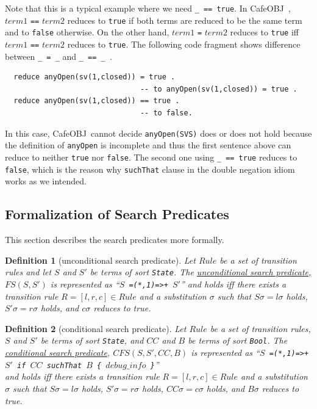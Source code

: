 \documentclass[12pt]{report}
\newtheorem{definition}{Definition}
\newcommand{\stt}[1]{{\small{\tt {#1}}}}
\newcommand{\ul}{\underline}
\newcommand{\cafeobj}{{\sf CafeOBJ}~}
\begin{document}
Note that this is a typical example where we need \stt{\_ == true}. In
\cafeobj, $term1$ {\tt ==} $term2$ reduces to {\tt true} if both terms
are reduced to be the same term and to {\tt false} otherwise. On the
other hand, $term1$ {\tt =} $term2$ reduces to {\tt true} iff $term1$
{\tt ==} $term2$ reduces to {\tt true}. The following code fragment
shows difference between \stt{\_ = \_} and \stt{\_ == \_ }.
\small
\begin{verbatim}
  reduce anyOpen(sv(1,closed)) = true .
                               -- to anyOpen(sv(1,closed)) = true .
  reduce anyOpen(sv(1,closed)) == true . 
                               -- to false.
\end{verbatim}
\normalsize
In this case, \cafeobj cannot decide \stt{anyOpen(SVS)} does or does
not hold because the definition of {\tt anyOpen} is incomplete and
thus the first sentence above can reduce to neither {\tt true} nor
{\tt false}.  The second one using \stt{\_ == true} reduces to
{\tt false}, which is the reason why {\tt suchThat} clause in the
double negation idiom works as we intended.

\subsection{Formalization of Search Predicates}
\label{sec:formalSeach}
This section describes the search predicates more formally.  
\begin{definition}[unconditional search predicate]
  Let $Rule$ be a set of transition rules and let $S$ and $S'$ be
  terms of sort {\tt State}. The \ul{unconditional search predicate,
    $FS(S,S')$} is represented as ``\stt{$S$ =(*,1)=>+ $S'$}''
  and holds iff there exists a transition rule $R=[l,r,c]\in Rule$ and
  a substitution $\sigma$ such that $S\sigma=l\sigma$ holds,
  $S'\sigma=r\sigma$ holds, and $c\sigma$ reduces to true.
\end{definition}
\begin{definition}[conditional search predicate]
  Let $Rule$ be a set of transition rules, $S$ and $S'$ be terms of
  sort {\tt State}, and $CC$ and $B$ be terms of sort {\tt Bool}. The
  \ul{conditional search predicate}, \ul{$CFS(S,S',CC,B)$} is
  represented as ``\stt{$S$ =(*,1)=>+ $S'$ if $CC$ suchThat $B$ \{
    $debug\_info$ \}}''\\ and holds iff there exists a transition
  rule $R=[l,r,c]\in Rule$ and a substitution $\sigma$ such that
  $S\sigma=l\sigma$ holds, $S'\sigma=r\sigma$ holds,
  $CC\sigma=c\sigma$ holds, and $B\sigma$ reduces to true.
\end{definition}
\end{document}
